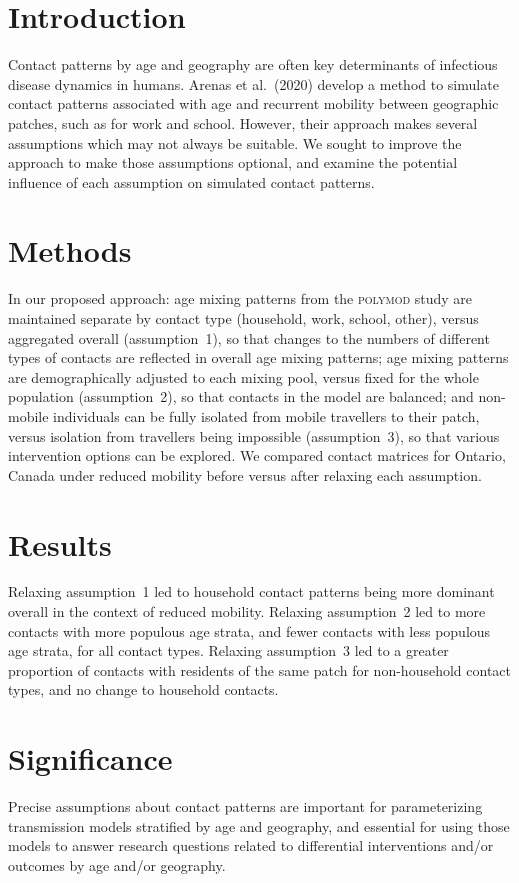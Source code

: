 \section{Introduction}
Contact patterns by age and geography are often key determinants of infectious disease dynamics in humans.
Arenas et al.\ (2020) develop a method to simulate contact patterns associated with
age and recurrent mobility between geographic patches, such as for work and school.
However, their approach makes several assumptions which may not always be suitable.
We sought to improve the approach to make those assumptions optional,
and examine the potential influence of each assumption on simulated contact patterns.
\section{Methods}
In our proposed approach:
age mixing patterns from the \textsc{polymod} study are maintained separate by contact type
(household, work, school, other),
versus aggregated overall (assumption~1),
so that changes to the numbers of different types of contacts are reflected in overall age mixing patterns;
age mixing patterns are demographically adjusted to each mixing pool,
versus fixed for the whole population (assumption~2),
so that contacts in the model are balanced; and
non-mobile individuals can be fully isolated from mobile travellers to their patch,
versus isolation from travellers being impossible (assumption~3),
so that various intervention options can be explored.
We compared contact matrices for Ontario, Canada under reduced mobility
before versus after relaxing each assumption.
\section{Results}
Relaxing assumption~1 led to
household contact patterns being more dominant overall in the context of reduced mobility.
Relaxing assumption~2 led to
more contacts with more populous age strata, and fewer contacts with less populous age strata,
for all contact types.
Relaxing assumption~3 led to
a greater proportion of contacts with residents of the same patch for non-household contact types,
and no change to household contacts.
\section{Significance}
Precise assumptions about contact patterns
are important for parameterizing transmission models stratified by age and geography,
and essential for using those models to answer research questions
related to differential interventions and/or outcomes by age and/or geography.